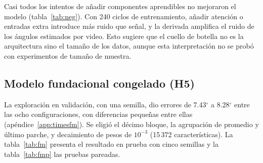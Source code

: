 \documentclass[11pt,a4paper]{amsart}
\newcommand{\gr}{$^{\circ}$}
\begin{document}
Casi todos los intentos de añadir componentes aprendibles no mejoraron el modelo (tabla~\ref{tab:neg}). Con 240 ciclos de entrenamiento, añadir atención o entradas extra introduce más ruido que señal, y la derivada amplifica el ruido de los ángulos estimados por video. Esto sugiere que el cuello de botella no es la arquitectura sino el tamaño de los datos, aunque esta interpretación no se probó con experimentos de tamaño de muestra.

\subsection{Modelo fundacional congelado (H5)}
\label{sec:fundacional}

La exploración en validación, con una semilla, dio errores de 7.43\gr{} a 8.28\gr{} entre las ocho configuraciones, con diferencias pequeñas entre ellas (apéndice~\ref{app:timesfm}). Se eligió el décimo bloque, la agrupación de promedio y último parche, y decaimiento de pesos de $10^{-3}$ (15\,372 características). La tabla~\ref{tab:fm} presenta el resultado en prueba con cinco semillas y la tabla~\ref{tab:fmp} las pruebas pareadas.
\end{document}
